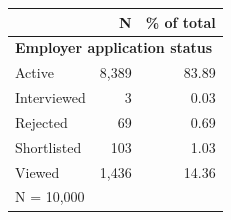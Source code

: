 \begin{tabular}{lrr}


\toprule


 & N & \% of total \\


\midrule


\multicolumn{3}{l}{\textbf{Employer application status}}\\ 
\midrule
Active              &       8,389&       83.89\\
Interviewed         &           3&        0.03\\
Rejected            &          69&        0.69\\
Shortlisted         &         103&        1.03\\
Viewed              &       1,436&       14.36\\
\midrule


\multicolumn{3}{l}{\footnotesize N =       10,000}\\


\bottomrule


\end{tabular}


